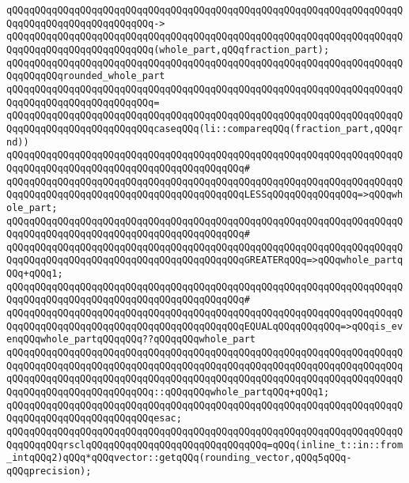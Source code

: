 \verb|qQQqqQQqqQQqqQQqqQQqqQQqqQQqqQQqqQQqqQQqqQQqqQQqqQQqqQQqqQQqqQQqqQQqqQQqqQQqqQQqqQQqqQQqqQQqqQQq->|\newline
\verb|qQQqqQQqqQQqqQQqqQQqqQQqqQQqqQQqqQQqqQQqqQQqqQQqqQQqqQQqqQQqqQQqqQQqqQQqqQQqqQQqqQQqqQQqqQQqqQQq(whole_part,qQQqfraction_part);|\newline
\newline
\verb|qQQqqQQqqQQqqQQqqQQqqQQqqQQqqQQqqQQqqQQqqQQqqQQqqQQqqQQqqQQqqQQqqQQqqQQqqQQqqQQqrounded_whole_part|\newline
\verb|qQQqqQQqqQQqqQQqqQQqqQQqqQQqqQQqqQQqqQQqqQQqqQQqqQQqqQQqqQQqqQQqqQQqqQQqqQQqqQQqqQQqqQQqqQQqqQQq=|\newline
\verb|qQQqqQQqqQQqqQQqqQQqqQQqqQQqqQQqqQQqqQQqqQQqqQQqqQQqqQQqqQQqqQQqqQQqqQQqqQQqqQQqqQQqqQQqqQQqqQQqcaseqQQq(li::compareqQQq(fraction_part,qQQqrnd))|\newline
\verb|qQQqqQQqqQQqqQQqqQQqqQQqqQQqqQQqqQQqqQQqqQQqqQQqqQQqqQQqqQQqqQQqqQQqqQQqqQQqqQQqqQQqqQQqqQQqqQQqqQQqqQQqqQQqqQQq#|\newline
\verb|qQQqqQQqqQQqqQQqqQQqqQQqqQQqqQQqqQQqqQQqqQQqqQQqqQQqqQQqqQQqqQQqqQQqqQQqqQQqqQQqqQQqqQQqqQQqqQQqqQQqqQQqqQQqqQQqLESSqQQqqQQqqQQqqQQq=>qQQqwhole_part;|\newline
\verb|qQQqqQQqqQQqqQQqqQQqqQQqqQQqqQQqqQQqqQQqqQQqqQQqqQQqqQQqqQQqqQQqqQQqqQQqqQQqqQQqqQQqqQQqqQQqqQQqqQQqqQQqqQQqqQQq#|\newline
\verb|qQQqqQQqqQQqqQQqqQQqqQQqqQQqqQQqqQQqqQQqqQQqqQQqqQQqqQQqqQQqqQQqqQQqqQQqqQQqqQQqqQQqqQQqqQQqqQQqqQQqqQQqqQQqqQQqGREATERqQQq=>qQQqwhole_partqQQq+qQQq1;|\newline
\verb|qQQqqQQqqQQqqQQqqQQqqQQqqQQqqQQqqQQqqQQqqQQqqQQqqQQqqQQqqQQqqQQqqQQqqQQqqQQqqQQqqQQqqQQqqQQqqQQqqQQqqQQqqQQqqQQq#|\newline
\verb|qQQqqQQqqQQqqQQqqQQqqQQqqQQqqQQqqQQqqQQqqQQqqQQqqQQqqQQqqQQqqQQqqQQqqQQqqQQqqQQqqQQqqQQqqQQqqQQqqQQqqQQqqQQqqQQqEQUALqQQqqQQqqQQq=>qQQqis_evenqQQqwhole_partqQQqqQQq??qQQqqQQqwhole_part|\newline
\verb|qQQqqQQqqQQqqQQqqQQqqQQqqQQqqQQqqQQqqQQqqQQqqQQqqQQqqQQqqQQqqQQqqQQqqQQqqQQqqQQqqQQqqQQqqQQqqQQqqQQqqQQqqQQqqQQqqQQqqQQqqQQqqQQqqQQqqQQqqQQqqQQqqQQqqQQqqQQqqQQqqQQqqQQqqQQqqQQqqQQqqQQqqQQqqQQqqQQqqQQqqQQqqQQqqQQqqQQqqQQqqQQqqQQqqQQqqQQq::qQQqqQQqwhole_partqQQq+qQQq1;|\newline
\verb|qQQqqQQqqQQqqQQqqQQqqQQqqQQqqQQqqQQqqQQqqQQqqQQqqQQqqQQqqQQqqQQqqQQqqQQqqQQqqQQqqQQqqQQqqQQqqQQqesac;|\newline
\newline
\verb|qQQqqQQqqQQqqQQqqQQqqQQqqQQqqQQqqQQqqQQqqQQqqQQqqQQqqQQqqQQqqQQqqQQqqQQqqQQqqQQqrsclqQQqqQQqqQQqqQQqqQQqqQQqqQQqqQQq=qQQq(inline_t::in::from_intqQQq2)qQQq*qQQqvector::getqQQq(rounding_vector,qQQq5qQQq-qQQqprecision);|\newline
